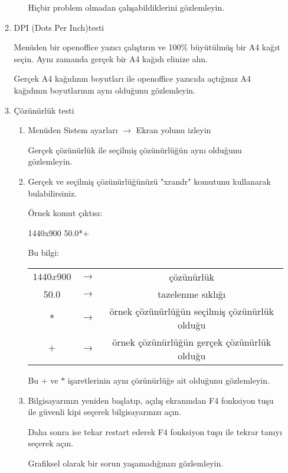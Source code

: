 \documentclass[a4paper,10pt]{article}
\begin{document}
\begin{itemize}
\begin{enumerate}
\begin{enumerate}
	  Hiçbir problem olmadan çalışabildiklerini gözlemleyin.
    \end{enumerate}

  \item DPI (Dots Per Inch)testi
    
        Menüden bir openoffice yazıcı çalıştırın ve 100\% büyütülmüş bir A4 kağıt seçin. Aynı zamanda gerçek bir A4 kağıdı elinize alın.

        Gerçek A4 kağıdının boyutları ile openoffice yazıcıda açtığınız A4 kağıdının boyutlarının aynı olduğunu gözlemleyin.
  \item Çözünürlük testi
     \begin{enumerate}
      \item Menüden Sistem ayarları $\rightarrow$ Ekran yolunu izleyin

	Gerçek çözünürlük ile seçilmiş çözünürlüğün aynı olduğunu gözlemleyin.

      \item Gerçek ve seçilmiş çözünürlüğünüzü "xrandr" komutunu kullanarak bulabilirsiniz.
	  
	  Örnek komut çıktısı:
	  
	  1440x900  50.0*+
	  
	  Bu bilgi:
	  \begin{table}[h]
	  \centering
	  \begin{tabular}{|c|c|c|}
		  \hline
		  $1440x900$ & $\rightarrow$ & çözünürlük \\
		  50.0       & $\rightarrow$ & tazelenme sıklığı \\
		  $*$        & $\rightarrow$ & örnek çözünürlüğün seçilmiş çözünürlük olduğu \\
		  $+$        & $\rightarrow$ & örnek çözünürlüğün gerçek çözünürlük olduğu\\
		  \hline
	  \end{tabular} 
	  \label{tab:tbl}
	  \end{table}

	  Bu $+$ ve $*$ işaretlerinin aynı çözünürlüğe ait olduğunu gözlemleyin. 

    \item Bilgisayarınızı yeniden başlatıp, açılış ekranından F4 fonksiyon tuşu ile güvenli kipi seçerek bilgisayarınızı açın.  

	  Daha sonra ise tekar restart ederek F4 fonksiyon tuşu ile tekrar tanıyı seçerek açın.

	  Grafiksel olarak bir sorun yaşamadığınızı gözlemleyin.
    \end{enumerate}
 

\end{enumerate}
\end{itemize}
\end{document}
